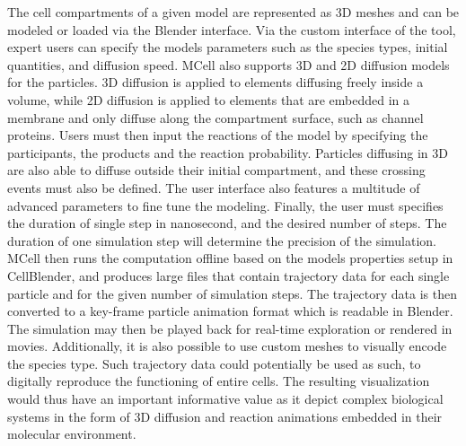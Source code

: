 The cell compartments of a given model are represented as 3D meshes and can be modeled or loaded via the Blender interface.
Via the custom interface of the tool, expert users can specify the models parameters such as the species types, initial quantities, and diffusion speed.
MCell also supports 3D and 2D diffusion models for the particles.
3D diffusion is applied to elements diffusing freely inside a volume, while 2D diffusion is applied to elements that are embedded in a membrane and only diffuse along the compartment surface, such as channel proteins.
Users must then input the reactions of the model by specifying the participants, the products and the reaction probability.
Particles diffusing in 3D are also able to diffuse outside their initial compartment, and these crossing events must also be defined.
The user interface also features a multitude of advanced parameters to fine tune the modeling.
Finally, the user must specifies the duration of single step in nanosecond, and the desired number of steps. 
The duration of one simulation step will determine the precision of the simulation.
MCell then runs the computation offline based on the models properties setup in CellBlender, and produces large files that contain trajectory data for each single particle and for the given number of simulation steps.
The trajectory data is then converted to a key-frame particle animation format which is readable in Blender.
The simulation may then be played back for real-time exploration or rendered in movies.
Additionally, it is also possible to use custom meshes to visually encode the species type.
Such trajectory data could potentially be used as such, to digitally reproduce the functioning of entire cells.
The resulting visualization would thus have an important informative value as it depict complex biological systems in the form of 3D diffusion and reaction animations embedded in their molecular environment.
